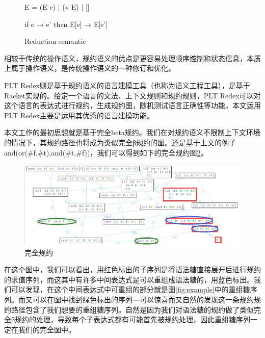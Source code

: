 		\begin{figure}[h]
			\centering 
			E = (E e) | (v E) | []
			
			if e → e' then E[e] → E[e']
			\caption{Reduction semantic}
			\label{fig:felleisen}
		\end{figure}  


相较于传统的操作语义，规约语义的优点是更容易处理顺序控制和状态信息，本质上属于操作语义，是传统操作语义的一种修订和优化。

PLT Redex则是基于规约语义的语言建模工具（也称为语义工程工具），是基于Racket实现的。给定一个语言的文法、上下文规则和规约规则，PLT Redex可以对这个语言的表达式进行规约，生成规约图，随机测试语言正确性等功能。本文运用PLT Redex主要是运用其优秀的语言建模功能。


本文工作的最初思想就是基于完全beta规约。我们在对规约语义不限制上下文环境的情况下，其规约路径也将成为类似完全β规约的图。还是基于上文的例子and(or(\#f,\#t),and(\#t,\#f))，我们可以得到如下的完全规约图\ref{fig:full_reduction}。

\begin{figure}[h]
	\centering
	\includegraphics[width=14cm]{images/chapter2/fullreduction.png}
	\caption{完全规约}
	\label{fig:full_reduction}
\end{figure}

在这个图中，我们可以看出，用{\color[rgb]{1,0,0}红色}标出的子序列是将语法糖直接展开后进行规约的求值序列，而这其中有许多中间表达式是可以重组成语法糖的，用{\color[rgb]{0,0,1}蓝色}标出。我们可以发现，在这个中间表达式中可重组的部分就是图\ref{fig:example}中的重组糖序列。而又可以在图中找到{\color[rgb]{0,1,0}绿色}标出的序列---可以惊喜而又自然的发现这一条规约规约路径包含了我们想要的重组糖序列。自然是因为我们对语法糖的规约做了类似完全β规约的处理，导致每个子表达式都有可能首先被规约处理，因此重组糖序列一定在我们的完全图中。
